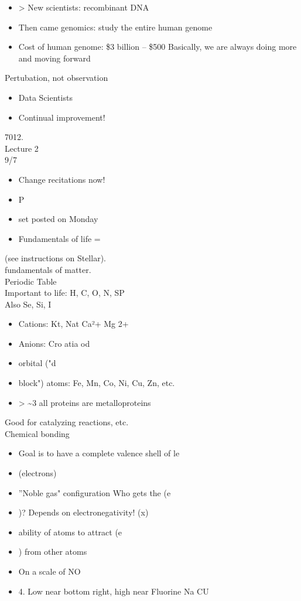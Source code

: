 \documentclass{article}
\begin{document}
\begin{itemize}\item > New scientists: recombinant DNA
\item  Then came genomics: study the entire human genome
\item  Cost of human genome: \$3 billion – \$500
Basically, we are always doing more and moving forward
\end{itemize}
Pertubation, not observation\\
\begin{itemize}\item  Data Scientists
\item  Continual improvement!
\end{itemize}
7012.\\
Lecture 2\\
9/7\\
\begin{itemize}\item  Change recitations now!
\item  P\item set posted on Monday
\item  Fundamentals of life =
\end{itemize}
(see instructions on Stellar).\\
fundamentals of matter.\\
Periodic Table\\
Important to life: H, C, O, N, SP\\
Also Se, Si, I\\
\begin{itemize}\item  Cations: Kt, Nat Ca²+ Mg 2+
\item  Anions: Cro atia
od\item orbital ("d\item block") atoms: Fe, Mn, Co, Ni, Cu, Zn, etc.
\item > \textasciitilde 3 all proteins are metalloproteins
\end{itemize}
Good for catalyzing reactions, etc.\\
Chemical bonding\\
\begin{itemize}\item  Goal is to have a complete valence shell of le\item (electrons)
\item  ''Noble gas" configuration
Who gets the (e\item )? Depends on electronegativity! (x)
\item  ability of atoms to attract (e\item ) from other atoms
\item  On a scale of NO\item 4. Low near bottom right, high near Fluorine
Na
CU
\end{itemize}
\end{document}
